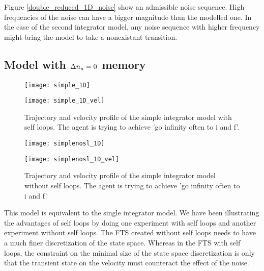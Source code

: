 Figure \ref{double_reduced_1D_noise} show an admissible noise sequence.
High frequencies of the noise can have a bigger magnitude than the modelled one. 
In the case of the second integrator model, any noise sequence with higher frequency might bring the model to take a nonexistant transition.



\subsection{Model with $\Delta n_u=0$ memory} \label{sec:single_int}
\begin{figure}[!ht]
	\begin{minipage}[b]{0.5\textwidth}
  		\centering
  		\texttt{[image: simple\_1D]}
	  	\label{simple_1D}
  \end{minipage}
	\begin{minipage}[b]{0.5\textwidth}
  		\centering
  		\texttt{[image: simple\_1D\_vel]}
	  	\label{simple_1D_vel}
  \end{minipage}
  \caption{Trajectory and velocity profile of the simple integrator model with self loops. The agent is trying to achieve 'go infinity often to i and f'.}
\end{figure}

\begin{figure}[!ht]
	\begin{minipage}[b]{0.5\textwidth}
  		\centering
  		\texttt{[image: simplenosl\_1D]}
	  	\label{simplenosl_1D}
  \end{minipage}
	\begin{minipage}[b]{0.5\textwidth}
  		\centering
  		\texttt{[image: simplenosl\_1D\_vel]}
	  	\label{simplenosl_1D_vel}
  \end{minipage}
  \caption{Trajectory and velocity profile of the simple integrator model without self loops. The agent is trying to achieve 'go infinity often to i and f'.}
\end{figure}


This model is equivalent to the single integrator model.
We have been illustrating the advantages of self loops by doing one experiment with self loops and another experiment without self loops.
The FTS created without self loops needs to have a much finer discretization of the state space.
Whereas in the FTS with self loops, the constraint on the minimal size of the state space discretization is only that the transient state on the velocity must counteract the effect of the noise.

